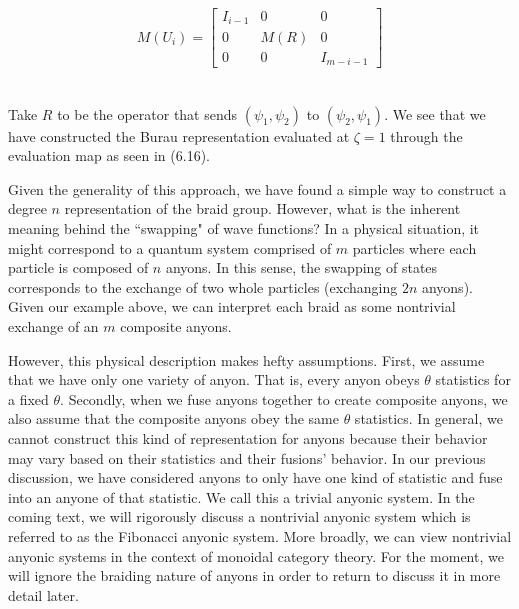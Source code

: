 \begin{equation}
	\begin{aligned}
		M(U_i) = \begin{bmatrix}
						I_{i-1} & 0 & 0 \\
						0 & M(R) & 0 \\
						0 & 0 & I_{m - i - 1}
					\end{bmatrix}
	\end{aligned}
\end{equation}\\


\begin{example}\end{example}Take $R$ to be the operator that sends $(\psi_1,\psi_2)$ to $(\psi_2,\psi_1)$. We see that we have constructed the Burau representation evaluated at $\zeta=1$ through the evaluation map as seen in (6.16).

Given the generality of this approach, we have found a simple way to construct a degree $n$ representation of the braid group. However, what is the inherent meaning behind the ``swapping" of wave functions? In a physical situation, it might correspond to a quantum system comprised of $m$ particles where each particle is composed of $n$ anyons. In this sense, the swapping of states corresponds to the exchange of two whole particles (exchanging $2n$ anyons). Given our example above, we can interpret each braid as some nontrivial exchange of an $m$ composite anyons. 

However, this physical description makes hefty assumptions. First, we assume that we have only one variety of anyon. That is, every anyon obeys $\theta$ statistics for a fixed $\theta$. Secondly, when we fuse anyons together to create composite anyons, we also assume that the composite anyons obey the same $\theta$ statistics. In general, we cannot construct this kind of representation for anyons because their behavior may vary based on their statistics and their fusions' behavior. In our previous discussion, we have considered anyons to only have one kind of statistic and fuse into an anyone of that statistic. We call this a trivial anyonic system. In the coming text, we will rigorously discuss a nontrivial anyonic system which is referred to as the Fibonacci anyonic system. More broadly, we can view nontrivial anyonic systems in the context of monoidal category theory. For the moment, we will ignore the braiding nature of anyons in order to return to discuss it in more detail later.

